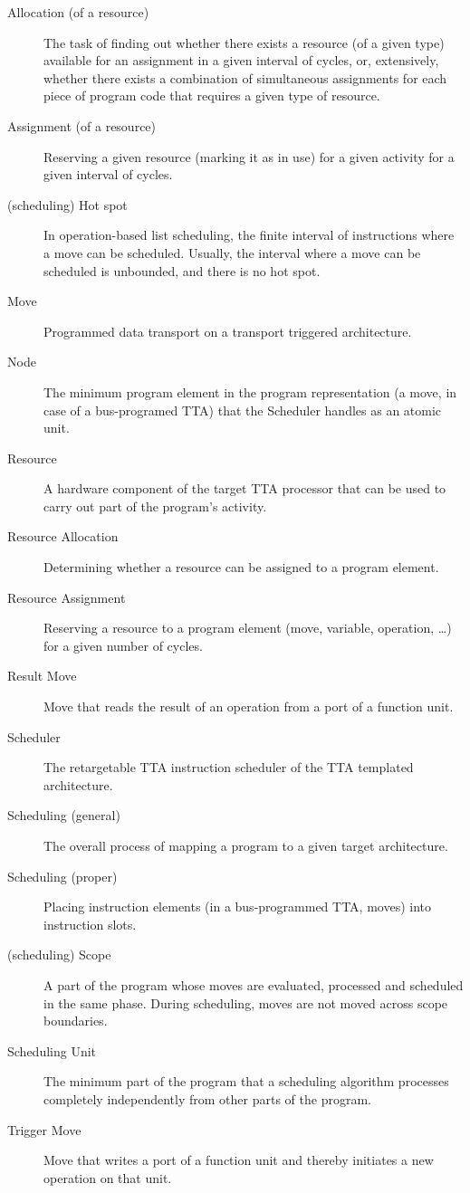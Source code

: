 \documentclass[a4paper,twoside]{tce}
\begin{document}
\begin{description}
\item[Allocation (of a resource)]%
  The task of finding out whether there exists a resource (of a given type)
  available for an assignment in a given interval of cycles, or,
  extensively, whether there exists a combination of simultaneous
  assignments for each piece of program code that requires a given type of
  resource.
\item[Assignment (of a resource)]%
  Reserving a given resource (marking it as in use) for a given activity for
  a given interval of cycles.
\item[(scheduling) Hot spot]%
  In operation-based list scheduling, the finite interval of instructions
  where a move can be scheduled. Usually, the interval where a move can be
  scheduled is unbounded, and there is no hot spot.
\item[Move]%
  Programmed data transport on a transport triggered architecture.
\item[Node]%
  The minimum program element in the program representation (a move, in case
  of a bus-programed TTA) that the Scheduler handles as an atomic unit.
\item[Resource]%
  A hardware component of the target TTA processor that can be used to carry
  out part of the program's activity.
\item[Resource Allocation]%
  Determining whether a resource can be assigned to a program element.
\item[Resource Assignment]%
  Reserving a resource to a program element (move, variable, operation,
  \ldots) for a given number of cycles.
\item[Result Move]%
  Move that reads the result of an operation from a port of a function unit.
\item[Scheduler]%
  The retargetable TTA instruction scheduler of the TTA templated
  architecture.
\item[Scheduling (general)]%
  The overall process of mapping a program to a given target architecture.
\item[Scheduling (proper)]%
  Placing instruction elements (in a bus-programmed TTA, moves) into
  instruction slots.
\item[(scheduling) Scope]%
  A part of the program whose moves are evaluated, processed and scheduled
  in the same phase. During scheduling, moves are not moved across scope
  boundaries.
\item[Scheduling Unit]%
  The minimum part of the program that a scheduling algorithm processes
  completely independently from other parts of the program.
\item[Trigger Move]%
  Move that writes a port of a function unit and thereby initiates a
  new operation on that unit.
\end{description}
\end{document}
